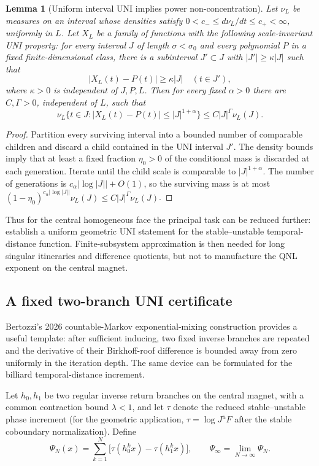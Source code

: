 \documentclass[11pt]{article}
\newtheorem{lemma}[theorem]{Lemma}
\begin{document}
\begin{lemma}[Uniform interval UNI implies power non-concentration]
\label{lem:interval-uni-qnl}
Let $\nu_L$ be measures on an interval whose densities satisfy
$0<c_-\le d\nu_L/dt\le c_+<\infty$, uniformly in $L$.  Let $X_L$ be a family
of functions with the following scale-invariant UNI property: for every
interval $J$ of length $\sigma<\sigma_0$ and every polynomial $P$ in a fixed
finite-dimensional class, there is a subinterval
$J'\subset J$ with $|J'|\ge\kappa|J|$ such that
\[
 |X_L(t)-P(t)|\ge\kappa|J|\quad(t\in J'),
\]
where $\kappa>0$ is independent of $J,P,L$.  Then for every fixed
$\alpha>0$ there are $C,\Gamma>0$, independent of $L$, such that
\[
 \nu_L\{t\in J:|X_L(t)-P(t)|\le |J|^{1+\alpha}\}
 \le C|J|^\Gamma\nu_L(J).
\]
\end{lemma}

\begin{proof}
Partition every surviving interval into a bounded number of comparable
children and discard a child contained in the UNI interval $J'$.  The density
bounds imply that at least a fixed fraction $\eta_0>0$ of the conditional
mass is discarded at each generation.  Iterate until the child scale is
comparable to $|J|^{1+\alpha}$.  The number of generations is
$c_\alpha|\log|J||+O(1)$, so the surviving mass is at most
$(1-\eta_0)^{c_\alpha|\log|J||}\nu_L(J)
\le C|J|^\Gamma\nu_L(J)$.
\end{proof}

Thus for the central homogeneous face the principal task can be reduced
further: establish a uniform geometric UNI statement for the
stable--unstable temporal-distance function.  Finite-subsystem approximation
is then needed for long singular itineraries and difference quotients, but
not to manufacture the QNL exponent on the central magnet.

\subsection{A fixed two-branch UNI certificate}

Bertozzi's 2026 countable-Markov exponential-mixing construction provides a
useful template: after sufficient inducing, two fixed inverse branches are
repeated and the derivative of their Birkhoff-roof difference is bounded away
from zero uniformly in the iteration depth.  The same device can be formulated
for the billiard temporal-distance increment.

Let $h_0,h_1$ be two regular inverse return branches on the central magnet,
with a common contraction bound $\lambda<1$, and let $\tau$ denote the
reduced stable--unstable phase increment (for the geometric application,
$\tau=\log J^uF$ after the stable coboundary normalization).  Define
\begin{equation}
\label{eq:two-branch-temporal-distance}
 \Psi_N(x)=\sum_{k=1}^N
 \bigl[\tau(h_0^kx)-\tau(h_1^kx)\bigr],
 \qquad
 \Psi_\infty=\lim_{N\to\infty}\Psi_N .
\end{equation}
\end{document}
